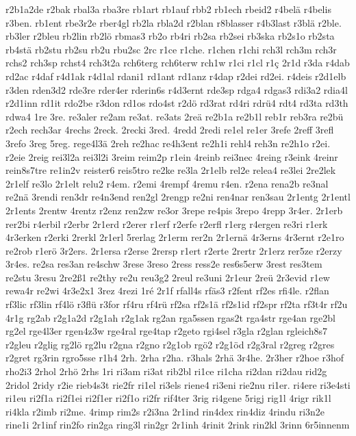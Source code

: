 {r2b1a2de
r2bak
rbal3a
rba3re
rb1art
rb1auf
rbb2
rb1ech
rbeid2
r4belä
r4belis
r3ben.
rb1ent
rbe3r2e
rber4gl
rb2la
rbla2d
r2blan
r8blasser
r4b3last
r3blä
r2ble.
rb3ler
r2bleu
rb2lin
rb2lö
rbmas3
rb2o
rb4ri
rb2sa
rb2sei
rb3ska
rb2s1o
rb2sta
rb4stä
rb2stu
rb2su
rb2u
rbu2sc
2rc
r1ce
r1che.
r1chen
r1chi
rch3l
rch3m
rch3r
rchs2
rch3sp
rchst4
rch3t2a
rch6terg
rch6terw
rch1w
r1ci
r1cl
r1ç
2r1d
r3da
r4dab
rd2ac
r4daf
r4d1ak
r4d1al
rdani1
rd1ant
rd1anz
r4dap
r2dei
rd2ei.
r4deis
r2d1elb
r3den
rden3d2
rde3re
rder4er
rderin6s
r4d3ernt
rde3sp
rdga4
rdgas3
rdi3a2
rdia4l
r2d1inn
rd1it
rdo2be
r3don
rd1os
rdo4st
r2dö
rd3rat
rd4ri
rdrü4
rdt4
rd3ta
rd3th
rdwa4
1re
3re.
re3aler
re2am
re3at.
re3ats
2reä
re2b1a
re2b1l
reb1r
reb3ra
re2bü
r2ech
rech3ar
4rechs
2reck.
2recki
3red.
4redd
2redi
re1el
re1er
3refe
2reff
3refl
3refo
3reg
5reg.
rege4l3ä
2reh
re2hac
re4h3ent
re2h1i
rehl4
reh3n
re2h1o
r2ei.
r2eie
2reig
rei3l2a
rei3l2i
3reim
reim2p
r1ein
4reinb
rei3nec
4reing
r3eink
4reinr
rein8s7tre
re1in2v
reister6
reis5tro
re2ke
re3la
2r1elb
rel2e
relea4
re3lei
2re2lek
2r1elf
re3lo
2r1elt
relu2
r4em.
r2emi
4rempf
4remu
r4en.
r2ena
rena2b
re3nal
re2nä
3rendi
ren3dr
re4n3end
ren2gl
2rengp
re2ni
ren4nar
ren3sau
2r1entg
2r1entl
2r1ents
2rentw
4rentz
r2enz
ren2zw
re3or
3repe
re4pis
3repo
4repp
3r4er.
2r1erb
rer2bi
r4erbil
r2erbr
2r1erd
r2erer
r1erf
r2erfe
r2erfl
r1erg
r4ergen
re3ri
r1erk
4r3erken
r2erki
2rerkl
2r1erl
5rerlag
2r1erm
rer2n
2r1ernä
4r3erns
4r3ernt
r2e1ro
re2rob
r1erö
3r2ers.
2r1ersa
r2erse
2rersp
r1ert
r2erte
2rertr
2r1erz
rer5ze
r2erzy
3r4es.
re2sa
res3an
re4schw
3rese
3reso
2ress
ress2e
res6s5erw
3rest
res3tem
re2stu
3resu
2re2ß1
re2thy
re2u
reu3g2
2reul
re3uni
2r1eur
2reü
2r3evid
r1ew
rewa4r
re2wi
4r3e2x1
3rez
4rezi
1ré
2r1f
rfall4s
rfäs3
r2fent
rf2es
rfi4le.
r2flan
rf3lic
rf3lin
rf4lö
r3flü
r3for
rf4ru
rf4rü
rf2sa
rf2s1ä
rf2s1id
rf2spr
rf2ta
rf3t4r
rf2u
4r1g
rg2ab
r2g1a2d
r2g1ah
r2g1ak
rg2an
rga5ssen
rgas2t
rga4str
rge4an
rge2bl
rg2el
rge4l3er
rgen4z3w
rge4ral
rge4tap
r2geto
rgi4sel
r3gla
r2glan
rgleich8s7
r2gleu
r2glig
rg2lö
rg2lu
r2gna
r2gno
r2g1ob
rgö2
r2g1öd
r2g3ral
r2greg
r2gres
r2gret
rg3rin
rgro5sse
r1h4
2rh.
2rha
r2ha.
r3hals
2rhä
3r4he.
2r3her
r2hoe
r3hof
rho2i3
2rhol
2rhö
2rhs
1ri
ri3am
ri3at
rib2bl
ri1ce
ri1cha
ri2dan
ri2dau
rid2g
2ridol
2ridy
r2ie
rieb4s3t
rie2fr
ri1el
ri3els
riene4
ri3eni
rie2nu
ri1er.
ri4ere
ri3e4sti
ri1eu
ri2f1a
ri2f1ei
ri2f1er
ri2f1o
ri2fr
rif4ter
3rig
ri4gene
5rigj
rig1l
4rigr
rik1l
ri4kla
r2imb
ri2me.
4rimp
rim2s
r2i3na
2r1ind
rin4dex
rin4diz
4rindu
ri3n2e
rine1i
2r1inf
rin2fo
rin2ga
ring3l
rin2gr
2r1inh
4rinit
2rink
rin2kl
3rinn
6r5innenm
}
